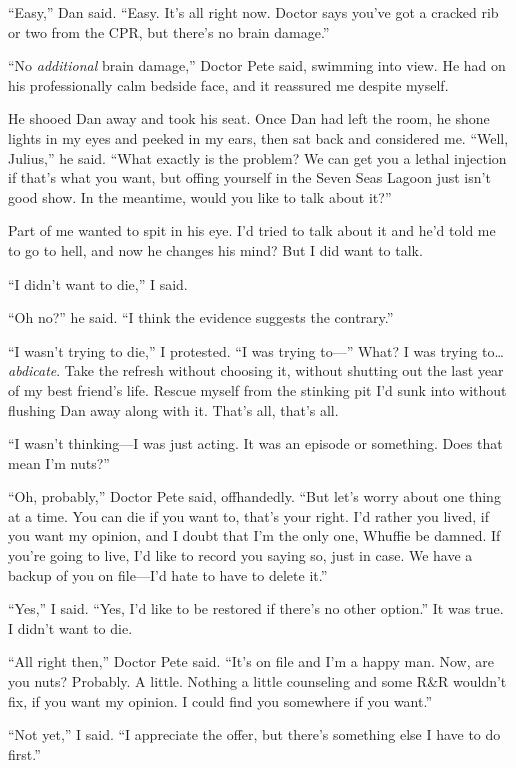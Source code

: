 “Easy,” Dan said. “Easy. It's all right now. Doctor says you've got
a cracked rib or two from the CPR, but there's no brain damage.”

“No \emph{additional} brain damage,” Doctor Pete said, swimming
into view. He had on his professionally calm bedside face, and it
reassured me despite myself.

He shooed Dan away and took his seat. Once Dan had left the room,
he shone lights in my eyes and peeked in my ears, then sat back and
considered me. “Well, Julius,” he said. “What exactly is the
problem? We can get you a lethal injection if that's what you want,
but offing yourself in the Seven Seas Lagoon just isn't good show.
In the meantime, would you like to talk about it?”

Part of me wanted to spit in his eye. I'd tried to talk about it
and he'd told me to go to hell, and now he changes his mind? But I
did want to talk.

“I didn't want to die,” I said.

“Oh no?” he said. “I think the evidence suggests the contrary.”

“I wasn't trying to die,” I protested. “I was trying to—” What? I
was trying to… \emph{abdicate}. Take the refresh without choosing
it, without shutting out the last year of my best friend's life.
Rescue myself from the stinking pit I'd sunk into without flushing
Dan away along with it. That's all, that's all.

“I wasn't thinking—I was just acting. It was an episode or
something. Does that mean I'm nuts?”

“Oh, probably,” Doctor Pete said, offhandedly. “But let's worry
about one thing at a time. You can die if you want to, that's your
right. I'd rather you lived, if you want my opinion, and I doubt
that I'm the only one, Whuffie be damned. If you're going to live,
I'd like to record you saying so, just in case. We have a backup of
you on file—I'd hate to have to delete it.”

“Yes,” I said. “Yes, I'd like to be restored if there's no other
option.” It was true. I didn't want to die.

“All right then,” Doctor Pete said. “It's on file and I'm a happy
man. Now, are you nuts? Probably. A little. Nothing a little
counseling and some R\&R wouldn't fix, if you want my opinion. I
could find you somewhere if you want.”

“Not yet,” I said. “I appreciate the offer, but there's something
else I have to do first.”

